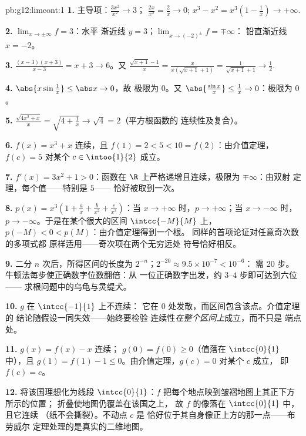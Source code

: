 \begin{solution}{pb:g12:limcont:1}
\textbf{1.} 主导项：$\frac{3x^2}{x^2} \to 3$；
$\frac{2x}{x^2} = \frac2x \to 0$;
$x^3 - x^2 = x^3\left(1 - \frac1x\right) \to +\infty$.

\textbf{2.} $\lim_{x \to \pm\infty} f = 3$：水平
渐近线 $y = 3$；$\lim_{x \to (-2)^\pm} f = \mp\infty$：
铅直渐近线 $x = -2$。

\textbf{3.} $\frac{(x-3)(x+3)}{x - 3} = x + 3 \to 6$。又
$\frac{\sqrt{x+1} - 1}{x} = \frac{x}{x(\sqrt{x+1} + 1)} =
\frac{1}{\sqrt{x+1} + 1} \to \frac12$.

\textbf{4.} $\abs{x \sin\frac1x} \leq \abs x \to 0$，故
极限为 $0$。又
$\abs{\frac{\sin x}{x}} \leq \frac1x \to 0$：极限为 $0$。

\textbf{5.} $\frac{\sqrt{4x^2 + x}}{x} =
\sqrt{4 + \frac1x} \to \sqrt4 = 2$（平方根函数的
连续性及复合）。

\textbf{6.} $f(x) = x^3 + x$ 连续，且
$f(1) = 2 < 5 < 10 = f(2)$：由介值定理，$f(c) = 5$ 对某个
$c \in \intoo{1}{2}$ 成立。

\textbf{7.} $f'(x) = 3x^2 + 1 > 0$：函数在
$\R$ 上严格递增且连续，极限为 $\mp\infty$：由双射
定理，每个值——特别是 $5$——
恰好被取到一次。

\textbf{8.} $p(x) = x^3\left(1 + \frac ax + \frac{b}{x^2} +
\frac{c}{x^3}\right)$：当 $x \to +\infty$ 时，$p \to +\infty$；当
$x \to -\infty$ 时，$p \to -\infty$。于是在某个很大的区间
$\intcc{-M}{M}$ 上，$p(-M) < 0 < p(M)$：由介值定理得到一个根。
同样的首项论证对任意奇次数的多项式都
原样适用——奇次项在两个无穷远处
符号恰好相反。

\textbf{9.} 二分 $n$ 次后，所得区间的长度为
$2^{-n}$；$2^{-20} \approx 9.5 \times 10^{-7} < 10^{-6}$：
需 20 步。牛顿法每步使正确数字位数翻倍：从
一位正确数字出发，约 $3$--$4$ 步即可达到六位——
求根问题中的乌龟与灵缇犬。

\textbf{10.} $g$ 在 $\intcc{-1}{1}$ 上不连续：
它在 $0$ 处发散，而区间包含该点。介值定理的
结论随假设一同失效——始终要检验
连续性\emph{在整个区间上}成立，而不只是
端点处。

\textbf{11.} $g(x) = f(x) - x$ 连续；
$g(0) = f(0) \geq 0$（值落在 $\intcc{0}{1}$ 中），且
$g(1) = f(1) - 1 \leq 0$。由介值定理，$g(c) = 0$ 对某个 $c$ 成立，
即 $f(c) = c$。

\textbf{12.} 将该国理想化为线段
$\intcc{0}{1}$：$f$ 把每个地点映到皱褶地图上其正下方所示的位置；
折叠使地图仍覆盖在该国之上，
故 $f$ 的像落在 $\intcc{0}{1}$ 中，且它连续
（纸不会撕裂）。不动点 $c$ 是
恰好位于其自身像正上方的那一点——布劳威尔
定理处理的是真实的二维地图。


\end{solution}
